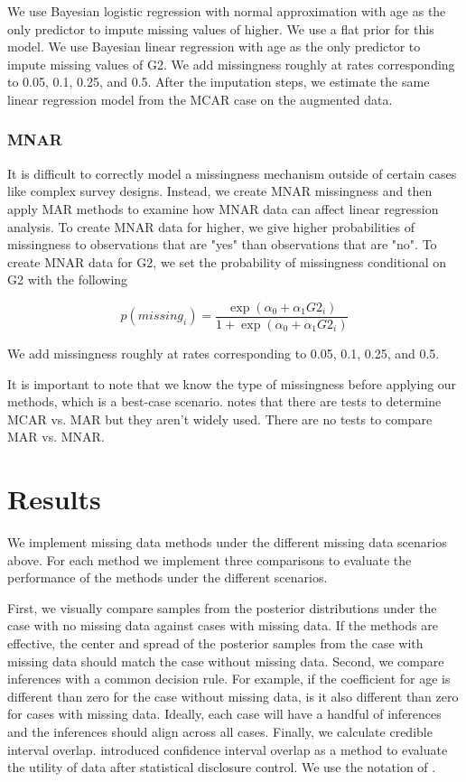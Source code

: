 \documentclass[11pt]{article}
\begin{document}
We use Bayesian logistic regression with normal approximation with age as the only predictor to impute missing values of higher. We use a flat prior for this model. We use Bayesian linear regression with age as the only predictor to impute missing values of G2. We add missingness roughly at rates corresponding to 0.05, 0.1, 0.25, and 0.5. After the imputation steps, we estimate the same linear regression model from the MCAR case on the augmented data.

\subsubsection{MNAR}

It is difficult to correctly model a missingness mechanism outside of certain cases like complex survey designs. Instead, we create MNAR missingness and then apply MAR methods to examine how MNAR data can affect linear regression analysis. To create MNAR data for higher, we give higher probabilities of missingness to observations that are "yes" than observations that are "no". To create MNAR data for G2, we set the probability of missingness conditional on G2 with the following

$$p(missing_i) = \frac{\exp(\alpha_0 + \alpha_1 G2_i)}{1 + \exp(\alpha_0 + \alpha_1 G2_i)}$$

We add missingness roughly at rates corresponding to 0.05, 0.1, 0.25, and 0.5. 

It is important to note that we know the type of missingness before applying our methods, which is a best-case scenario. \cite{vanBurren2018} notes that there are tests to determine MCAR vs. MAR but they aren't widely used. There are no tests to compare MAR vs. MNAR.

\section{Results}

We implement missing data methods under the different missing data scenarios above. For each method we implement three comparisons to evaluate the performance of the methods under the different scenarios. 

First, we visually compare samples from the posterior distributions under the case with no missing data against cases with missing data. If the methods are effective, the center and spread of the posterior samples from the case with missing data should match the case without missing data. Second, we compare inferences with a common decision rule. For example, if the coefficient for age is different than zero for the case without missing data, is it also different than zero for cases with missing data. Ideally, each case will have a handful of inferences and the inferences should align across all cases. Finally, we calculate credible interval overlap. \cite{Karr2006} introduced confidence interval overlap as a method to evaluate the utility of data after statistical disclosure control. We use the notation of \cite{Snoke2018}.
\end{document}
